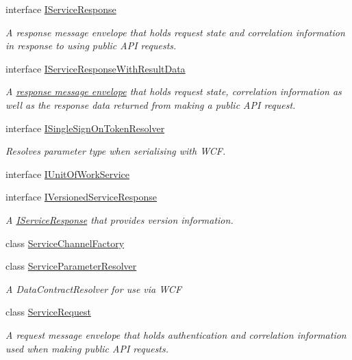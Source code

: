 \begin{DoxyCompactItemize}
interface \hyperlink{interfaceCqrs_1_1Services_1_1IServiceResponse}{I\+Service\+Response}
\begin{DoxyCompactList}\small\item\em A response message envelope that holds request state and correlation information in response to using public A\+PI requests. \end{DoxyCompactList}\item 
interface \hyperlink{interfaceCqrs_1_1Services_1_1IServiceResponseWithResultData}{I\+Service\+Response\+With\+Result\+Data}
\begin{DoxyCompactList}\small\item\em A \hyperlink{interfaceCqrs_1_1Services_1_1IServiceResponse}{response message envelope} that holds request state, correlation information as well as the response data returned from making a public A\+PI request. \end{DoxyCompactList}\item 
interface \hyperlink{interfaceCqrs_1_1Services_1_1ISingleSignOnTokenResolver}{I\+Single\+Sign\+On\+Token\+Resolver}
\begin{DoxyCompactList}\small\item\em Resolves parameter type when serialising with W\+CF. \end{DoxyCompactList}\item 
interface \hyperlink{interfaceCqrs_1_1Services_1_1IUnitOfWorkService}{I\+Unit\+Of\+Work\+Service}
\item 
interface \hyperlink{interfaceCqrs_1_1Services_1_1IVersionedServiceResponse}{I\+Versioned\+Service\+Response}
\begin{DoxyCompactList}\small\item\em A \hyperlink{interfaceCqrs_1_1Services_1_1IServiceResponse}{I\+Service\+Response} that provides version information. \end{DoxyCompactList}\item 
class \hyperlink{classCqrs_1_1Services_1_1ServiceChannelFactory}{Service\+Channel\+Factory}
\item 
class \hyperlink{classCqrs_1_1Services_1_1ServiceParameterResolver}{Service\+Parameter\+Resolver}
\begin{DoxyCompactList}\small\item\em A Data\+Contract\+Resolver for use via W\+CF \end{DoxyCompactList}\item 
class \hyperlink{classCqrs_1_1Services_1_1ServiceRequest}{Service\+Request}
\begin{DoxyCompactList}\small\item\em A request message envelope that holds authentication and correlation information used when making public A\+PI requests. \end{DoxyCompactList}\item 

\end{DoxyCompactItemize}
